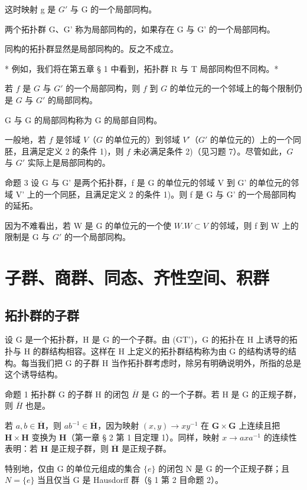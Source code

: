 这时映射 g 是 \(G'\) 与 G 的一个局部同构。

两个拓扑群 G、G' 称为局部同构的，如果存在 G 与 G' 的一个局部同构。

同构的拓扑群显然是局部同构的。反之不成立。

* 例如，我们将在第五章 § 1 中看到，拓扑群 R 与 T 局部同构但不同构。*

若 \(f\) 是 \(G\) 与 \(G'\) 的一个局部同构，则 \(f\) 到 \(G\) 的单位元的一个邻域上的每个限制仍是 \(G\) 与 \(G'\) 的局部同构。

G 与 G 的局部同构称为 G 的局部自同构。

一般地，若 \(f\) 是邻域 \(V\)（\(G\) 的单位元的）到邻域 \(V'\)（\(G'\) 的单位元的）上的一个同胚，且满足定义 2 的条件 1)，则 \(f\) 未必满足条件 2)（见习题 7）。尽管如此，\(G\) 与 \(G'\) 实际上是局部同构的。

命题 3 设 G 与 G' 是两个拓扑群，f 是 G 的单位元的邻域 V 到 G' 的单位元的邻域 V' 上的一个同胚，且满足定义 2 的条件 1)。则 f 是 G 与 G' 的一个局部同构的延拓。

因为不难看出，若 W 是 G 的单位元的一个使 \(W.W \subset V\) 的邻域，则 f 到 W 上的限制是 G 与 \(G'\) 的一个局部同构。

\section{子群、商群、同态、齐性空间、积群}

\subsection{拓扑群的子群}

设 G 是一个拓扑群，H 是 G 的一个子群。由 (GT')，G 的拓扑在 H 上诱导的拓扑与 H 的群结构相容。这样在 H 上定义的拓扑群结构称为由 G 的结构诱导的结构。每当我们把 G 的子群 H 当作拓扑群考虑时，除另有明确说明外，所指的总是这个诱导结构。

命题 1 拓扑群 G 的子群 H 的闭包 \(\overline{H}\) 是 G 的一个子群。若 H 是 G 的正规子群，则 \(\overline{H}\) 也是。

若 \(a, b \in \overline{\mathbf{H}}\)，则 \(ab^{-1} \in \overline{\mathbf{H}}\)，因为映射 \((x, y) \to xy^{-1}\) 在 \(\mathbf{G} \times \mathbf{G}\) 上连续且把 \(\mathbf{H} \times \mathbf{H}\) 变换为 \(\mathbf{H}\)（第一章 § 2 第 1 目定理 1）。同样，映射 \(x \to axa^{-1}\) 的连续性表明：若 \(\mathbf{H}\) 是正规子群，则 \(\overline{\mathbf{H}}\) 是正规子群。

特别地，仅由 G 的单位元组成的集合 \(\{e\}\) 的闭包 N 是 G 的一个正规子群；且 \(N=\{e\}\) 当且仅当 G 是 Hausdorff 群（§ 1 第 2 目命题 2）。

